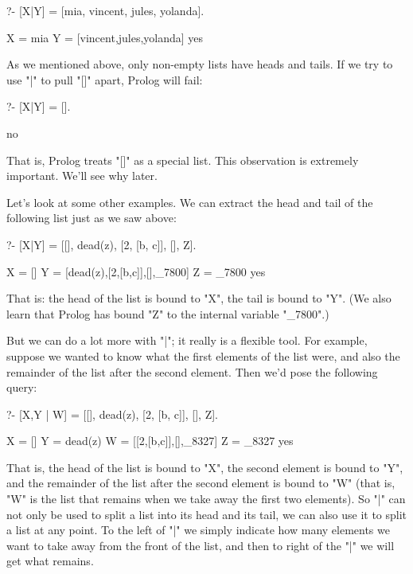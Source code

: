 \begin{LPNcodedisplay}
?- [X|Y] = [mia, vincent, jules, yolanda].

X = mia
Y = [vincent,jules,yolanda]
yes
\end{LPNcodedisplay}



As we mentioned above, only non-empty lists have heads and tails.  If
we try to use "|" to pull "[]" apart, Prolog will fail:

\begin{LPNcodedisplay}
?- [X|Y] = [].

no
\end{LPNcodedisplay}
That is, Prolog treats "[]" as a special list.  This observation
is extremely  important.  We'll see why later.

Let's look at some other examples.  We can extract the head and tail
of the following list just as we saw above:

\begin{LPNcodedisplay}
?- [X|Y] = [[], dead(z), [2, [b, c]], [], Z].

X = []
Y = [dead(z),[2,[b,c]],[],_7800]
Z = _7800
yes
\end{LPNcodedisplay}
That is: the head of the list is bound to "X", the tail is bound
to "Y".  (We also learn that Prolog has bound
"Z" to the internal variable "_7800".)

But we  can do a lot more with "|"; it really is a
flexible tool.  For example, suppose we wanted to know what the first
 elements of the list were, and also the remainder of the
list after the second element.  Then we'd pose the following query:

\begin{LPNcodedisplay}
?- [X,Y | W] = [[], dead(z), [2, [b, c]], [], Z].

X = []
Y = dead(z)
W = [[2,[b,c]],[],_8327]
Z = _8327
yes
\end{LPNcodedisplay}

That is, the head of the list is bound to "X", the second element is
bound to "Y", and the remainder of the list after the second element
is bound to "W" (that is, "W" is the list that remains when we take
away the first two elements). So "|" can not only be used to split a
list into its head and its tail, we can also use it to split a list at
any point. To the left of "|" we simply indicate how many elements we
want to take away from the front of the list, and then to right of the
"|" we will get what remains.

